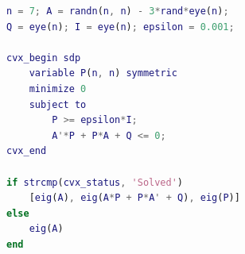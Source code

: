 \begin{lstlisting}[language=Matlab]
n = 7; A = randn(n, n) - 3*rand*eye(n);
Q = eye(n); I = eye(n); epsilon = 0.001;

cvx_begin sdp
    variable P(n, n) symmetric
    minimize 0
    subject to
        P >= epsilon*I;
        A'*P + P*A + Q <= 0;
cvx_end

if strcmp(cvx_status, 'Solved')
    [eig(A), eig(A*P + P*A' + Q), eig(P)]
else
    eig(A)
end
\end{lstlisting}